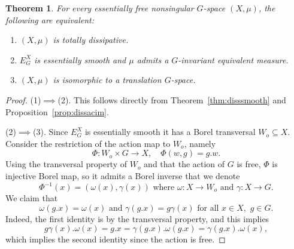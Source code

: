 \documentclass[10pt,a4paper]{amsart}
\newtheorem{thm}{Theorem}
\begin{document}
\begin{thm}
For every essentially free nonsingular \(G\)-space \(\left(X,\mu\right)\), the following are equivalent:
\begin{enumerate}
    \item \(\left(X,\mu\right)\) is totally dissipative.
    \item \(E_{G}^{X}\) is essentially smooth and \(\mu\) admits a \(G\)-invariant equivalent measure.
    \item \(\left(X,\mu\right)\) is isomorphic to a translation \(G\)-space.
\end{enumerate}
\end{thm}

\begin{proof}
(1)\(\implies\)(2). This follows directly from Theorem~\ref{thm:disssmooth} and Proposition~\ref{prop:dissacim}.

(2)\(\implies\)(3). Since \(E_{G}^{X}\) is essentially smooth it has a Borel transversal \(W_{o}\subseteq X\). Consider the restriction of the action map to \(W_{o}\), namely
\[\Phi:W_{o}\times G\to X,\quad \Phi\left(w,g\right)=g.w.\]
Using the transversal property of \(W_{o}\) and that the action of \(G\) is free, \(\Phi\) is injective Borel map, so it admits a Borel inverse that we denote
\[\Phi^{-1}\left(x\right)=\left(\omega\left(x\right),\gamma\left(x\right)\right)\text{ where }\omega:X\to W_{o}\text{ and }\gamma:X\to G.\]
We claim that
\[\omega\left(g.x\right)=\omega\left(x\right)\text{ and }\gamma\left(g.x\right)=g\gamma\left(x\right)\text{ for all }x\in X,\,\,g\in G.\]
Indeed, the first identity is by the transversal property, and this implies
\[g\gamma\left(x\right).\omega\left(x\right)=g.x=\gamma\left(g.x\right).\omega\left(g.x\right)=\gamma\left(g.x\right).\omega\left(x\right),\]
which implies the second identity since the action is free.


\end{proof}
\end{document}

